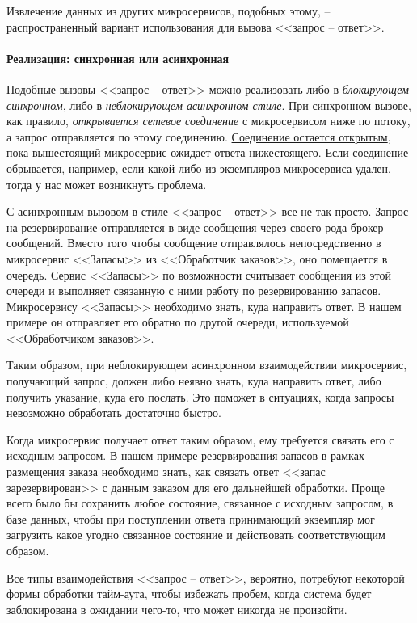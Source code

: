 \documentclass[%
	11pt,
	a4paper,
	utf8,
		]{article}
\begin{document}
Извлечение данных из других микросервисов, подобных этому, -- распространенный вариант использования для вызова <<запрос -- ответ>>.

\paragraph{Реализация: синхронная или асинхронная}

Подобные вызовы <<запрос -- ответ>> можно реализовать либо в \emph{блокирующем синхронном}, либо в \emph{неблокирующем асинхронном стиле}. При синхронном вызове, как правило, \emph{открывается сетевое соединение} с микросервисом ниже по потоку, а запрос отправляется по этому соединению. \underline{Соединение остается открытым}, пока вышестоящий микросервис ожидает ответа нижестоящего. Если соединение обрывается, например, если какой-либо из экземпляров микросервиса удален, тогда у нас может возникнуть проблема.

С асинхронным вызовом в стиле <<запрос -- ответ>> все не так просто. Запрос на резервирование отправляется в виде сообщения через своего рода брокер сообщений. Вместо того чтобы сообщение отправлялось непосредственно в микросервис <<Запасы>> из <<Обработчик заказов>>, оно помещается в очередь. Сервис <<Запасы>> по возможности считывает сообщения из этой очереди и выполняет связанную с ними работу по резервированию запасов. Микросервису <<Запасы>> необходимо знать, куда направить ответ. В нашем примере он отправляет его обратно по другой очереди, используемой <<Обработчиком заказов>>.

Таким образом, при неблокирующем асинхронном взаимодействии микросервис, получающий запрос, должен либо неявно знать, куда направить ответ, либо получить указание, куда его послать. Это поможет в ситуациях, когда запросы невозможно обработать достаточно быстро.

Когда микросервис получает ответ таким образом, ему требуется связать его с исходным запросом. В нашем примере резервирования запасов в рамках размещения заказа необходимо знать, как связать ответ <<запас зарезервирован>> с данным заказом для его дальнейшей обработки. Проще всего было бы сохранить любое состояние, связанное с исходным запросом, в базе данных, чтобы при поступлении ответа принимающий экземпляр мог загрузить какое угодно связанное состояние и действовать соответствующим образом.

Все типы взаимодействия <<запрос -- ответ>>, вероятно, потребуют некоторой формы обработки тайм-аута, чтобы избежать пробем, когда система будет заблокирована в ожидании чего-то, что может никогда не произойти.
\end{document}
